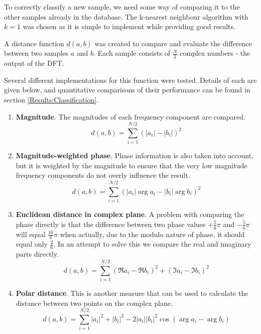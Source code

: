 To correctly classify a new sample, we need some way of comparing it to the other samples already in the database.
The k-nearest neighbour algorithm with $k=1$ was chosen as it is simple to implement while providing good results.

A distance function $d(a,b)$ was created to compare and evaluate the difference between two samples $a$ and $b$.
Each sample consists of $\frac{N}{2}$ complex numbers - the output of the DFT.

Several different implementations for this function were tested.
Details of each are given below, and quantitative comparisons of their performance can be found in section \ref{Results:Classification}.

\begin{enumerate}
	\item \textbf{Magnitude}.
		The magnitudes of each frequency component are compared.
		\begin{equation}
			d(a, b) = \sum_{i=1}^{N/2} \left( \left|a_i\right| - \left|b_i\right| \right)^2
		\end{equation}
	
	\item \textbf{Magnitude-weighted phase}.
		Phase information is also taken into account, but it is weighted by the magnitude to ensure that
		the very low magnitude frequency components do not overly influence the result.
		\begin{equation}
			d(a, b) = \sum_{i=1}^{N/2} \left( \left|a_i\right| \arg a_i - \left|b_i\right| \arg b_i \right)^2
		\end{equation}

	\item \textbf{Euclidean distance in complex plane}.
		A problem with comparing the phase directly is that the difference between two phase values $+\frac{5}{6}\pi$ and $-\frac{5}{6}\pi$ will
		equal $\frac{10}{6}\pi$ when actually, due to the modulo nature of phase, it should equal only $\frac{2}{6}$.
		In an attempt to solve this we compare the real and imaginary parts directly.
		\begin{equation}
			d(a, b) = \sum_{i=1}^{N/2} \left( \Re{a_i} - \Re{b_i} \right)^2 + \left( \Im{a_i} - \Im{b_i} \right)^2
		\end{equation}
	
	\item \textbf{Polar distance}.
		This is another measure that can be used to calculate the distance between two points on the complex plane.
		\begin{equation}
			d(a, b) = \sum_{i=1}^{N/2} \left|a_i\right|^2 + \left|b_i\right|^2 - 2 \left|a_i\right| \left|b_i\right|^2 \cos\left(\arg a_i - \arg b_i\right)
		\end{equation}
	

\end{enumerate}
